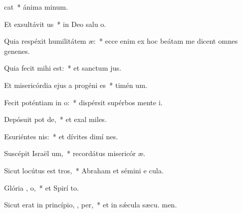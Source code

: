 \item {}cat~* ánima  minum.
\item Et exsultávit  us~* in Deo salu o.
\item Quia respéxit humilitátem  æ:~* ecce enim ex hoc beátam me dicent omnes genenes.
\item Quia fecit mihi    est:~* et sanctum  jus.
\item Et misericórdia ejus a progéni  es~* timén um.
\item Fecit poténtiam in  o:~* dispérsit supérbos mente  i.
\item Depósuit pot  de,~* et exal miles.
\item Esuriéntes  nis:~* et dívites dimí nes.
\item Suscépit Israël  um,~* recordátus misericór æ.
\item Sicut locútus est   tros,~* Abraham et sémini e  cula.
\item Glória ,  o,~* et Spirí to.
\item Sicut erat in princípio,  ,  per,~* et in sǽcula sæcu. men.
